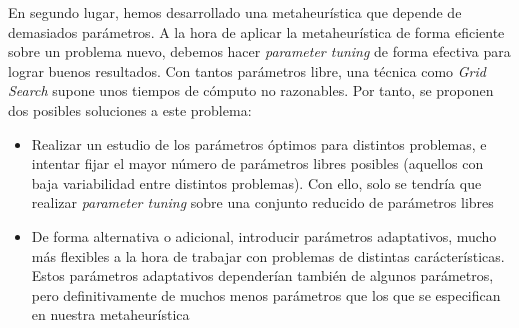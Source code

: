 \documentclass[11pt]{article}
\begin{document}
En segundo lugar, hemos desarrollado una metaheurística que depende de demasiados parámetros. A la hora de aplicar la metaheurística de forma eficiente sobre un problema nuevo, debemos hacer \emph{parameter tuning} de forma efectiva para lograr buenos resultados. Con tantos parámetros libre, una técnica como \emph{Grid Search} supone unos tiempos de cómputo no razonables. Por tanto, se proponen dos posibles soluciones a este problema:

\begin{itemize}
    \item Realizar un estudio de los parámetros óptimos para distintos problemas, e intentar fijar el mayor número de parámetros libres posibles (aquellos con baja variabilidad entre distintos problemas). Con ello, solo se tendría que realizar \emph{parameter tuning} sobre una conjunto reducido de parámetros libres
    \item De forma alternativa o adicional, introducir parámetros adaptativos, mucho más flexibles a la hora de trabajar con problemas de distintas carácterísticas. Estos parámetros adaptativos dependerían también de algunos parámetros, pero definitivamente de muchos menos parámetros que los que se especifican en nuestra metaheurística
\end{itemize}

\pagebreak



\end{document}
